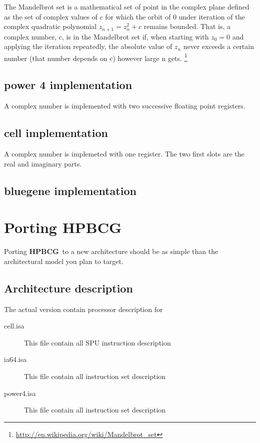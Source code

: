 \documentclass{article}
\newcommand{\hpbcg}{\textbf{HPBCG}\ }
\begin{document}
The Mandelbrot set is a mathematical set of point in the complex plane
defined as the set of complex values of $c$ for which the orbit of 0
under iteration of the complex quadratic polynomial $z_{n+1} = z_n^2 + c$
remains bounded. That is, a complex number, c, is in the Mandelbrot
set if, when starting with $z_0=0$ and applying the iteration repeatedly,
the absolute value of $z_n$ never exceeds a certain number (that number
depends on $c$) however large n
gets. \footnote{\url{http://en.wikipedia.org/wiki/Mandelbrot_set}}

\subsection{power 4 implementation}

A complex number is implemented with two successive floating point registers.

\subsection{cell implementation}

A complex number is implemeted with one register. The two first slots
are the real and imaginary parts.

\subsection{bluegene implementation}


\section{Porting \hpbcg}

Porting \hpbcg to a new architecture should be as simple than the
architectural model you plan to target.

\subsection{Architecture description}

The actual version contain processor description for 
\begin{description}
\item[cell.isa] This file contain all SPU instruction description
\item[ia64.isa] This file contain all instruction set description
\item[power4.isa] This file contain all instruction set description
\end{description}
\end{document}
